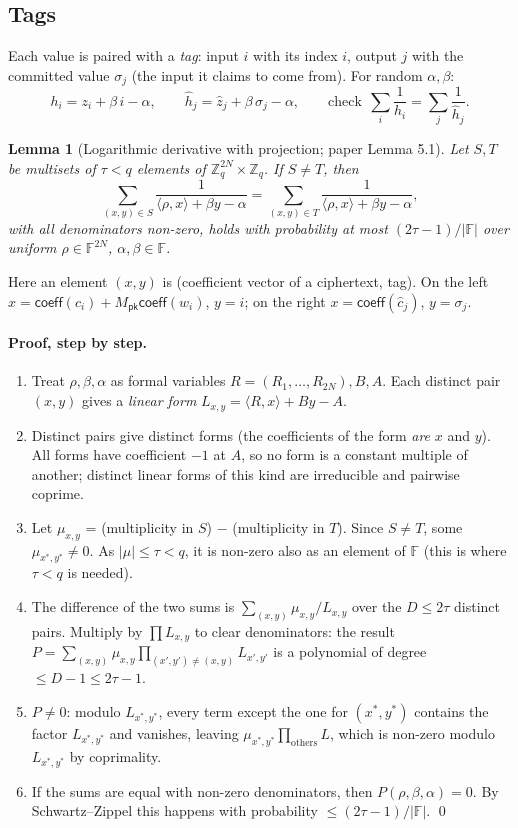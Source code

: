 \documentclass[11pt,a4paper]{article}
\newcommand{\Zq}{\mathbb{Z}_q}
\newcommand{\F}{\mathbb{F}}
\newcommand{\coeff}{\mathsf{coeff}}
\newcommand{\Mpk}{M_{\mathsf{pk}}}
\newcommand{\ip}[2]{\langle #1, #2\rangle}
\newcommand{\hh}{\hat{h}}
\newcommand{\zh}{\hat{z}}
\newcommand{\ch}{\hat{c}}
\theoremstyle{definition}
\theoremstyle{plain}
\newtheorem{lemma}[definition]{Lemma}
\begin{document}
\subsection{Tags}

Each value is paired with a \emph{tag}: input $i$ with its index $i$, output $j$ with the committed
value $\sigma_j$ (the input it claims to come from). For random $\alpha,\beta$:
\[
  h_i=z_i+\beta\, i-\alpha,\qquad \hh_j=\zh_j+\beta\,\sigma_j-\alpha,\qquad
  \text{check}\ \ \sum_i\frac1{h_i}=\sum_j\frac1{\hh_j}.
\]

\begin{lemma}[Logarithmic derivative with projection; paper Lemma 5.1]\label{lem:logder}
Let $S,T$ be multisets of $\tau<q$ elements of $\Zq^{2N}\times\Zq$. If $S\neq T$, then
\[
  \sum_{(x,y)\in S}\frac{1}{\ip{\rho}{x}+\beta y-\alpha}=\sum_{(x,y)\in T}\frac{1}{\ip{\rho}{x}+\beta y-\alpha},
\]
with all denominators non-zero, holds with probability at most $(2\tau-1)/|\F|$ over uniform
$\rho\in\F^{2N}$, $\alpha,\beta\in\F$.
\end{lemma}

Here an element $(x,y)$ is (coefficient vector of a ciphertext, tag). On the left $x=\coeff(c_i)+\Mpk\coeff(w_i)$,
$y=i$; on the right $x=\coeff(\ch_j)$, $y=\sigma_j$.

\paragraph{Proof, step by step.}
\begin{enumerate}[leftmargin=1.5em]
\item Treat $\rho,\beta,\alpha$ as formal variables $R=(R_1,\dots,R_{2N}),B,A$. Each distinct pair
  $(x,y)$ gives a \emph{linear form} $L_{x,y}=\ip{R}{x}+By-A$.
\item Distinct pairs give distinct forms (the coefficients of the form \emph{are} $x$ and $y$). All forms
  have coefficient $-1$ at $A$, so no form is a constant multiple of another; distinct linear forms of
  this kind are irreducible and pairwise coprime.
\item Let $\mu_{x,y}$ = (multiplicity in $S$) $-$ (multiplicity in $T$). Since $S\neq T$, some
  $\mu_{x^*,y^*}\neq 0$. As $|\mu|\le\tau<q$, it is non-zero also as an element of $\F$ (this is
  where $\tau<q$ is needed).
\item The difference of the two sums is $\sum_{(x,y)}\mu_{x,y}/L_{x,y}$ over the $D\le 2\tau$ distinct
  pairs. Multiply by $\prod L_{x,y}$ to clear denominators: the result
  $P=\sum_{(x,y)}\mu_{x,y}\prod_{(x',y')\neq(x,y)}L_{x',y'}$ is a polynomial of degree $\le D-1\le 2\tau-1$.
\item $P\neq 0$: modulo $L_{x^*,y^*}$, every term except the one for $(x^*,y^*)$ contains the factor
  $L_{x^*,y^*}$ and vanishes, leaving $\mu_{x^*,y^*}\prod_{\text{others}}L$, which is non-zero modulo
  $L_{x^*,y^*}$ by coprimality.
\item If the sums are equal with non-zero denominators, then $P(\rho,\beta,\alpha)=0$. By Schwartz--Zippel
  this happens with probability $\le(2\tau-1)/|\F|$. \qed
\end{enumerate}
\end{document}
